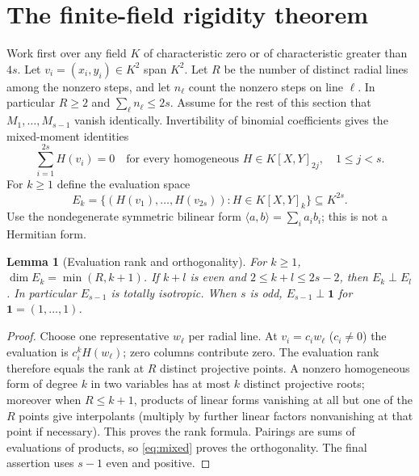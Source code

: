 \documentclass[11pt]{article}
\newtheorem{lemma}[theorem]{Lemma}
\theoremstyle{remark}\newtheorem{remark}[theorem]{Remark}
\begin{document}
\section{The finite-field rigidity theorem}\label{sec:rigidity}
Work first over any field $K$ of characteristic zero or of characteristic greater than $4s$. Let $v_i=(x_i,y_i)\in K^2$ span $K^2$. Let $R$ be the number of distinct radial lines among the nonzero steps, and let $n_\ell$ count the nonzero steps on line $\ell$. In particular $R\ge2$ and $\sum_\ell n_\ell\le2s$. Assume for the rest of this section that $M_1,\ldots,M_{s-1}$ vanish identically. Invertibility of binomial coefficients gives the mixed-moment identities
\begin{equation}\label{eq:mixed}
 \sum_{i=1}^{2s} H(v_i)=0
 \quad\text{for every homogeneous }H\in K[X,Y]_{2j},\quad 1\le j<s.
\end{equation}
For $k\ge1$ define the evaluation space
\[
 E_k=\{(H(v_1),\dots,H(v_{2s})):H\in K[X,Y]_k\}\subseteq K^{2s}.
\]
Use the nondegenerate symmetric bilinear form $\langle a,b\rangle=\sum_i a_i b_i$; this is not a Hermitian form.

\begin{lemma}[Evaluation rank and orthogonality]\label{lem:rank}
For $k\ge1$, $\dim E_k=\min(R,k+1)$. If $k+l$ is even and $2\le k+l\le2s-2$, then $E_k\perp E_l$. In particular $E_{s-1}$ is totally isotropic. When $s$ is odd, $E_{s-1}\perp\mathbf1$ for $\mathbf1=(1,\ldots,1)$.
\end{lemma}
\begin{proof}
Choose one representative $w_\ell$ per radial line. At $v_i=c_iw_\ell$ ($c_i\ne0$) the evaluation is $c_i^k H(w_\ell)$; zero columns contribute zero. The evaluation rank therefore equals the rank at $R$ distinct projective points. A nonzero homogeneous form of degree $k$ in two variables has at most $k$ distinct projective roots; moreover when $R\le k+1$, products of linear forms vanishing at all but one of the $R$ points give interpolants (multiply by further linear factors nonvanishing at that point if necessary). This proves the rank formula. Pairings are sums of evaluations of products, so \eqref{eq:mixed} proves the orthogonality. The final assertion uses $s-1$ even and positive.
\end{proof}
\end{document}
